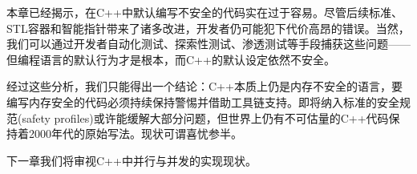 本章已经揭示，在C++中默认编写不安全的代码实在过于容易。尽管后续标准、STL容器和智能指针带来了诸多改进，开发者仍可能犯下代价高昂的错误。当然，我们可以通过开发者自动化测试、探索性测试、渗透测试等手段捕获这些问题——但编程语言的默认行为才是根本，而C++的默认设定依然不安全。

经过这些分析，我们只能得出一个结论：C++本质上仍是内存不安全的语言，要编写内存安全的代码必须持续保持警惕并借助工具链支持。即将纳入标准的安全规范(safety profiles)或许能缓解大部分问题，但世界上仍有不可估量的C++代码保持着2000年代的原始写法。现状可谓喜忧参半。

下一章我们将审视C++中并行与并发的实现现状。